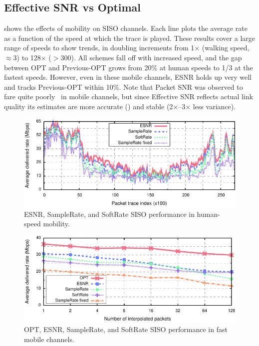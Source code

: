 \subsection{Effective SNR vs Optimal}
 shows the effects of mobility on SISO channels. Each line plots the average rate as a function of the speed at which the trace is played. These results cover a large range of speeds to show trends, in doubling increments from 1$\times$ (walking speed, $\approx$3\mph) to 128$\times$ ($>$300\mph). All schemes fall off with increased speed, and the gap between OPT and Previous-OPT grows from 20\% at human speeds to 1/3 at the fastest speeds. However, even in these mobile channels, ESNR holds up very well and tracks Previous-OPT within 10\%.
Note that Packet SNR was observed to fare quite poorly~\cite{Vutukuru_SoftRate} in mobile channels, but since Effective SNR reflects actual link quality its estimates are more accurate () and stable (2$\times$--3$\times$ less variance).

\begin{figure}[t]
      \centering
      \includegraphics[width=\textwidth]{figures/rate/siso_rate_time_opt_eff_sr_so.pdf}
      \caption[SISO algorithm performance in human-speed mobility]{\label{fig:siso_rate_time_opt_eff_sr_so} ESNR, SampleRate, and SoftRate SISO performance in human-speed mobility.}
\end{figure}
\begin{figure}[t]
      \centering
      \includegraphics[width=\textwidth]{figures/rate/siso_rate_skip_opt_eff_sr_so.pdf}
      \caption[SISO algorithm performance in fast mobile channels]{\label{fig:siso_rate_skip_opt_eff_sr_so} OPT, ESNR, SampleRate, and SoftRate SISO performance in fast mobile channels.}
\end{figure}


